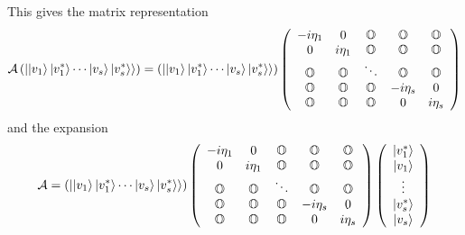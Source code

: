 \documentclass[aps,preprint]{revtex4}%
\begin{document}
This gives the matrix representation
\begin{equation}
\mathcal{A}\left(  \left\vert \left\vert v_{1}\right\rangle \left\vert
v_{1}^{\ast}\right\rangle \cdots\left\vert v_{s}\right\rangle \left\vert
v_{s}^{\ast}\right\rangle \right\rangle \right)  =\left(  \left\vert
\left\vert v_{1}\right\rangle \left\vert v_{1}^{\ast}\right\rangle
\cdots\left\vert v_{s}\right\rangle \left\vert v_{s}^{\ast}\right\rangle
\right\rangle \right)  \left(
\begin{array}
[c]{ccccc}%
-i\eta_{1} & 0 & \mathbb{O} & \mathbb{O} & \mathbb{O}\\
0 & i\eta_{1} & \mathbb{O} & \mathbb{O} & \mathbb{O}\\
\mathbb{O} & \mathbb{O} & \ddots & \mathbb{O} & \mathbb{O}\\
\mathbb{O} & \mathbb{O} & \mathbb{O} & -i\eta_{s} & 0\\
\mathbb{O} & \mathbb{O} & \mathbb{O} & 0 & i\eta_{s}%
\end{array}
\right)
\end{equation}
and the expansion%
\begin{equation}
\mathcal{A}=\left(  \left\vert \left\vert v_{1}\right\rangle \left\vert
v_{1}^{\ast}\right\rangle \cdots\left\vert v_{s}\right\rangle \left\vert
v_{s}^{\ast}\right\rangle \right\rangle \right)  \left(
\begin{array}
[c]{ccccc}%
-i\eta_{1} & 0 & \mathbb{O} & \mathbb{O} & \mathbb{O}\\
0 & i\eta_{1} & \mathbb{O} & \mathbb{O} & \mathbb{O}\\
\mathbb{O} & \mathbb{O} & \ddots & \mathbb{O} & \mathbb{O}\\
\mathbb{O} & \mathbb{O} & \mathbb{O} & -i\eta_{s} & 0\\
\mathbb{O} & \mathbb{O} & \mathbb{O} & 0 & i\eta_{s}%
\end{array}
\right)  \left(
\begin{array}
[c]{c}%
\left\vert v_{1}^{\ast}\right\rangle \\
\left\vert v_{1}\right\rangle \\
\vdots\\
\left\vert v_{s}^{\ast}\right\rangle \\
\left\vert v_{s}\right\rangle
\end{array}
\right)
\end{equation}
\end{document}
